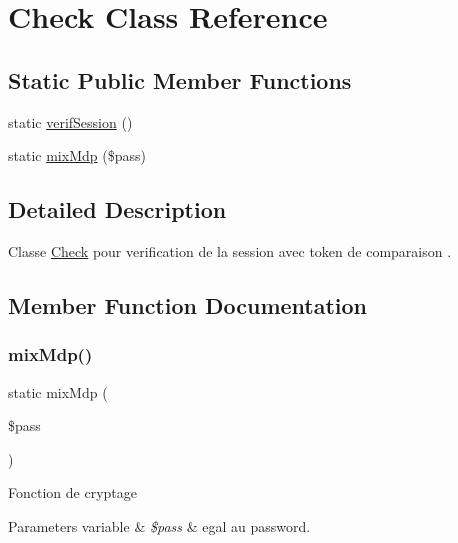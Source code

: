 \hypertarget{class_app_1_1_check}{}\section{Check Class Reference}
\label{class_app_1_1_check}
\subsection*{Static Public Member Functions}
\begin{DoxyCompactItemize}
\item 
static \hyperlink{class_app_1_1_check_a762802022c6341f5a11a5bd2d24e374a}{verif\+Session} ()
\item 
static \hyperlink{class_app_1_1_check_a336fdbb25ca75f575c65d04924058db9}{mix\+Mdp} (\$pass)
\end{DoxyCompactItemize}


\subsection{Detailed Description}
Classe \hyperlink{class_app_1_1_check}{Check} pour verification de la session avec token de comparaison . 

\subsection{Member Function Documentation}
\mbox{\label{class_app_1_1_check_a336fdbb25ca75f575c65d04924058db9}} 
\subsubsection{\texorpdfstring{mix\+Mdp()}{mixMdp()}}
{\footnotesize\ttfamily static mix\+Mdp (\begin{DoxyParamCaption}\item[{}]{\$pass }\end{DoxyParamCaption})\hspace{0.3cm}{\ttfamily [static]}}

Fonction de cryptage 
\begin{DoxyParams}[1]{Parameters}
variable & {\em \$pass} & egal au password. \\
\hline
\end{DoxyParams}
\mbox{\label{class_app_1_1_check_a762802022c6341f5a11a5bd2d24e374a}} 
